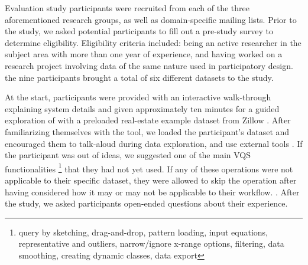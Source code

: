 \par Evaluation study participants were recruited from each of the three aforementioned research groups, as well as domain-specific mailing lists. Prior to the study, we asked potential participants to fill out a pre-study survey to determine eligibility. Eligibility criteria included: being an active researcher in the subject area with more than one year of experience, and having worked on a research project involving data of the same nature used in participatory design.   the nine participants brought a total of six different datasets to the study. 
\par At the start, participants were provided with an interactive walk-through explaining system details and given approximately ten minutes for a guided exploration of \zvpp with a preloaded real-estate example dataset from Zillow \cite{zillow}. After familiarizing themselves with the tool, we loaded the participant's dataset and encouraged them to talk-aloud during data exploration, and use external tools . If the participant was out of ideas, we suggested one of the main VQS functionalities \footnote{query by sketching, drag-and-drop, pattern loading, input equations, representative and outliers, narrow/ignore x-range options, filtering, data smoothing, creating dynamic classes,  data export} that they had not yet used. If any of these operations were not applicable to their specific dataset, they were allowed to skip the operation after having considered how it may or may not be applicable to their workflow. . After the study, we asked participants open-ended questions about their experience.%
